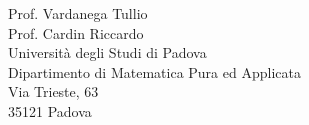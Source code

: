 \documentclass{letter}
\begin{document}
	
	
	\date{}
	
	\begin{letter}{
			\hfill Prof. Vardanega Tullio \\
			\hfill Prof. Cardin Riccardo \\
			\hfill Università degli Studi di Padova \\
			\hfill Dipartimento di Matematica Pura ed Applicata \\
			\hfill Via Trieste, 63 \\
			\hfill 35121 Padova
		}
		
		
		\signature{
			\begin{center}
				\textit{\GR{} \\ Responsabile \gruppo{}}
			\end{center}
		}
		
		

\end{letter}
\end{document}
